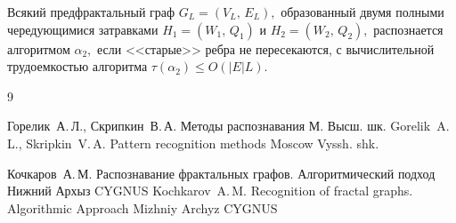 \begin{theorem}Всякий предфрактальный граф $G_L =(V_L,\,E_L),$ образованный двумя полными чередующимися
затравками $H_1 =(W_1,\,Q_1 )$ и $H_2 =(W_2,\,Q_2),$ распознается алгоритмом $\alpha_2,$ если <<старые>> ребра не пересекаются, с
вычислительной трудоемкостью алгоритма $\tau (\alpha_2) \le O ( |E| L).$
\end{theorem}

\begin{thebibliography}{9}

\by Горелик~А.\,Л., Скрипкин~В.\,А.
\book Методы распознавания
\publaddr М.
\publ Высш. шк.
\misctransl
\by Gorelik~A.\,L., Skripkin~V.\,A.
\book Pattern recognition methods
\publaddr Moscow
\publ Vyssh. shk.


\by Кочкаров~А.\,М.
\book Распознавание фрактальных графов. Алгоритмический подход
\publaddr Нижний Архыз
\publ CYGNUS
\misctransl
\by Kochkarov~A.\,M.
\book Recognition of fractal graphs. Algorithmic Approach
\publaddr Mizhniy Archyz
\publ CYGNUS



\end{thebibliography}


\noindent
\hskip6.5cm \thedate \par\noindent
\hskip6.5cm\therevdate

\vspace{-10mm}

\makeengtitle

\renewcommand{\baselinestretch}{0.9}

%
